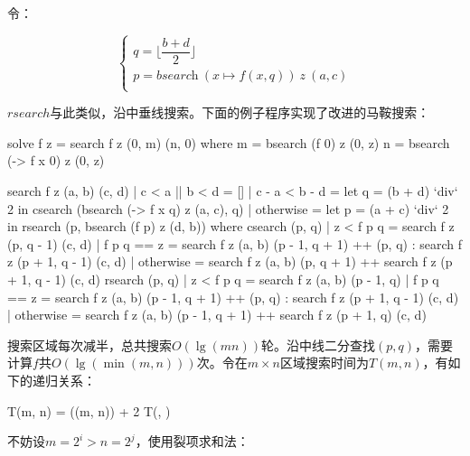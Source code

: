 \documentclass[b5paper]{ctexart}
\begin{document}
令：

\[
\begin{cases}
q = \lfloor \dfrac{b + d}{2} \rfloor \\
p = \textit{bsearch}\ (x \mapsto f(x, q))\ z\ (a, c) \\
\end{cases}
\]

\be
{}
\ee

$rsearch$与此类似，沿中垂线搜索。下面的例子程序实现了改进的马鞍搜索：

\begin{Haskell}
solve f z = search f z (0, m) (n, 0) where
  m = bsearch (f 0) z (0, z)
  n = bsearch (\x -> f x 0) z (0, z)

search f z (a, b) (c, d)
       | c < a || b < d = []
       | c - a < b - d = let q = (b + d) `div` 2 in
           csearch (bsearch (\x -> f x q) z (a, c), q)
       | otherwise = let p = (a + c) `div` 2 in
           rsearch (p, bsearch (f p) z (d, b))
  where
    csearch (p, q)
        | z < f p q = search f z (p, q - 1) (c, d)
        | f p q == z = search f z (a, b) (p - 1, q + 1) ++
                 (p, q) : search f z (p + 1, q - 1) (c, d)
        | otherwise = search f z (a, b) (p, q + 1) ++
                 search f z (p + 1, q - 1) (c, d)
    rsearch (p, q)
        | z < f p q = search f z (a, b) (p - 1, q)
        | f p q == z = search f z (a, b) (p - 1, q + 1) ++
                 (p, q) : search f z (p + 1, q - 1) (c, d)
        | otherwise = search f z (a, b) (p - 1, q + 1) ++
                 search f z (p + 1, q) (c, d)
\end{Haskell}

搜索区域每次减半，总共搜索$O(\lg (mn))$轮。沿中线二分查找$(p, q)$，需要计算$f$共$O(\lg (\min(m, n)))$次。令在$m \times n$区域搜索时间为$T(m, n)$，有如下的递归关系：

\be
T(m, n) = \lg(\min(m, n)) + 2 T(, )
\ee

不妨设$m = 2^i > n = 2^j$，使用裂项求和法：
\end{document}
